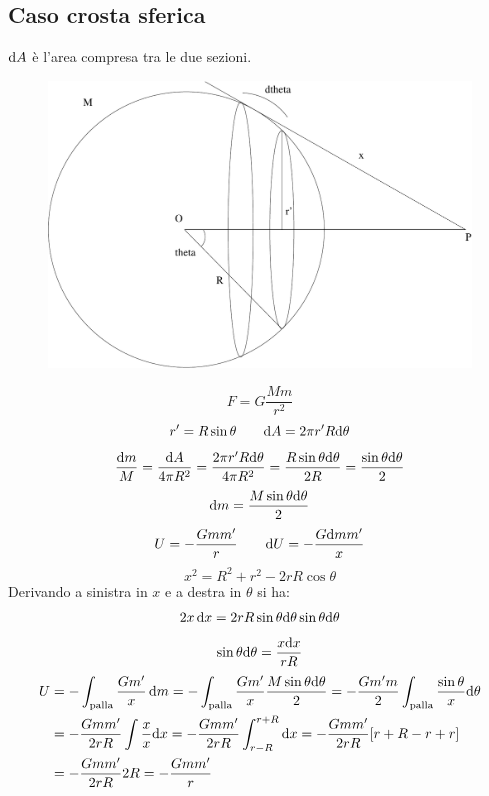 \subsection{Caso crosta sferica}
$\mathrm{d} A$ è l'area compresa tra le due sezioni.
\begin{figure}[htbp]
   \centering
   \includegraphics[scale=0.3]{immagini/fisica1/crosta}
\end{figure}
\begin{equation*}F=G\frac{Mm}{r^2}\end{equation*}
\begin{equation*}r'=R\sin\theta\qquad \mathrm{d} A=2\pi r'R\mathrm{d}\theta\end{equation*}
\[\frac{\mathrm{d} m}{M}=\frac{\mathrm{d}
A}{4\pi R^2}=\frac{2\pi r'R\mathrm{d}\theta}{4\pi
R^2}=\frac{R\sin\theta\mathrm{d}\theta}{2R}=\frac{\sin\theta\mathrm{d}\theta}{2}\]
\begin{equation*}\mathrm{d} m=\frac{M\sin\theta\mathrm{d}\theta}{2}\end{equation*}
\begin{equation*}U=-\frac{Gmm'}{r}\qquad\mathrm{d} U=-\frac{G\mathrm{d} m m'}{x}\end{equation*}
\begin{equation*}x^2=R^2+r^2-2rR\cos\theta\end{equation*}
Derivando a sinistra in $x$ e a destra in $\theta$ si ha:
\begin{equation*}2x\,\mathrm{d} x=2rR\sin\theta\mathrm{d}\theta\sin\theta\mathrm{d}\theta\end{equation*}
\begin{equation*}\sin\theta\mathrm{d}\theta=\frac{x\mathrm{d} x}{rR}\end{equation*}
\begin{align*}
U&=-\int_{\text{palla}}\frac{Gm'}{x}\,\mathrm{d}
m=-\int_{\text{palla}}\frac{Gm'}{x}\frac{M\sin\theta\mathrm{d}\theta}{2}=-\frac{Gm'
m}{2}\int_{\text{palla}}\frac{\sin\theta}{x}\mathrm{d}\theta\\
&=-\frac{Gmm'}{2rR}\int\frac{x}{x}\mathrm{d}
x=-\frac{Gmm'}{2rR}\int_{r-R}^{r+R}\mathrm{d}
x=-\frac{Gmm'}{2rR}[r+R-r+r]\\
&=-\frac{Gmm'}{2rR}2R=-\frac{Gmm'}{r}
\end{align*}

